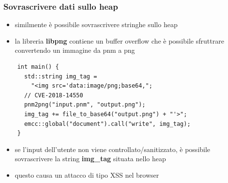 \documentclass{beamer}
\begin{document}
\begin{frame}[fragile]
  \frametitle{Sovrascrivere dati sullo heap}
  \begin{itemize}
    \item similmente è possibile sovrascrivere stringhe sullo heap
    \item la libreria \textbf{libpng} contiene un buffer overflow che
      è possibile sfruttrare convertendo un immagine da pnm a png 
  \end{itemize}
  \begin{verbatim}
    int main() {
      std::string img_tag = 
        "<img src='data:image/png;base64,";
      // CVE-2018-14550
      pnm2png("input.pnm", "output.png");        
      img_tag += file_to_base64("output.png") + "'>";
      emcc::global("document").call("write", img_tag);
    }
  \end{verbatim}
  \begin{itemize}
    \item se l'input dell'utente non viene controllato/sanitizzato, è possibile
      sovrascrivere la string \textbf{img\_tag} situata nello heap 
    \item questo causa un attacco di tipo XSS nel browser
  \end{itemize}
\end{frame}
\end{document}
